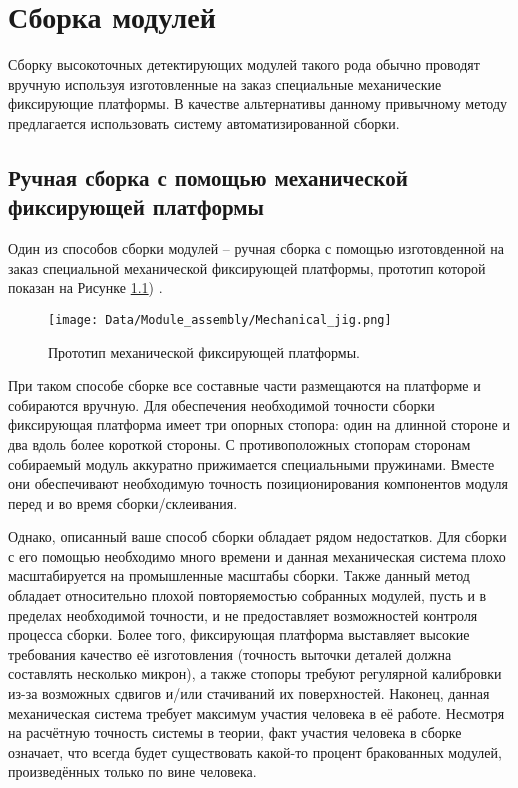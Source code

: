 \chapter{Сборка модулей}

Сборку высокоточных детектирующих модулей такого рода обычно проводят вручную используя изготовленные на заказ специальные механические фиксирующие платформы. В качестве альтернативы данному привычному методу предлагается использовать систему автоматизированной сборки.

\section{Ручная сборка с помощью механической фиксирующей платформы}

Один из способов сборки модулей -- ручная сборка с помощью изготовденной на заказ специальной механической фиксирующей платформы, прототип которой показан на Рисунке \ref{fig:mechanical_jig}) \cite{Automated_assembly_slides}.

\begin{figure}[ht]\centering
\texttt{[image: Data/Module\_assembly/Mechanical\_jig.png]}
\caption{Прототип механической фиксирующей платформы.}
\label{fig:mechanical_jig}
\end{figure}

При таком способе сборке все составные части размещаются на платформе и собираются вручную. Для обеспечения необходимой точности сборки фиксирующая платформа имеет три опорных стопора: один на длинной стороне и два вдоль более короткой стороны. С противоположных стопорам сторонам собираемый модуль аккуратно прижимается специальными пружинами. Вместе они обеспечивают необходимую точность позиционирования компонентов модуля перед и во время сборки/склеивания.

Однако, описанный ваше способ сборки обладает рядом недостатков. Для сборки с его помощью необходимо много времени и данная механическая система плохо масштабируется на промышленные масштабы сборки. Также данный метод обладает относительно плохой повторяемостью собранных модулей, пусть и в пределах необходимой точности, и не предоставляет возможностей контроля процесса сборки. Более того, фиксирующая платформа выставляет высокие требования качество её изготовления (точность выточки деталей должна составлять несколько микрон), а также стопоры требуют регулярной калибровки из-за возможных сдвигов и/или стачиваний их поверхностей. Наконец, данная механическая система требует максимум участия человека в её работе. Несмотря на расчётную точность системы в теории, факт участия человека в сборке означает, что всегда будет существовать какой-то процент бракованных модулей, произведённых только по вине человека.

